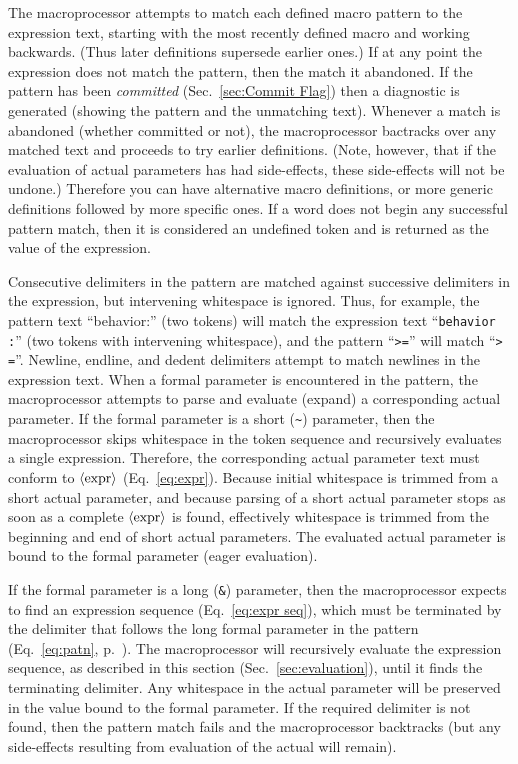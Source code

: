 \documentclass[12pt]{article}
\begin{document}
The macroprocessor attempts to match each defined macro pattern to the expression text, starting with the most recently defined macro and working backwards.
(Thus later definitions supersede earlier ones.)
If at any point the expression does not match the pattern, then the match it abandoned.
If the pattern has been \emph{committed} (Sec.\ \ref{sec:Commit Flag}) then a diagnostic is generated (showing the pattern and the unmatching text).
Whenever a match is abandoned (whether committed or not), the macroprocessor bactracks over any matched text and proceeds to try earlier definitions.
(Note, however, that if the evaluation of actual parameters has had side-effects, these side-effects will not be undone.)
Therefore you can have alternative macro definitions, or more generic definitions followed by more specific ones.
If a word does not begin any successful pattern match, then it is considered an undefined token and is returned as the value of the expression.

Consecutive delimiters in the pattern are matched against successive delimiters in the expression, but intervening whitespace is ignored.
Thus, for example, the pattern text ``\lstinline""behavior:'' (two tokens) will match the expression text ``\lstinline[showspaces=true]"behavior :"'' (two tokens with intervening whitespace),
and the pattern ``\lstinline">="'' will match ``\lstinline[showspaces=true]"> ="''.
Newline, endline, and dedent delimiters attempt to match newlines in the expression text.
When a formal parameter is encountered in the pattern, the macroprocessor attempts to parse and evaluate (expand) a corresponding actual parameter.
If the formal parameter is a short (\verb+~+) parameter, then the macroprocessor skips whitespace in the token sequence and recursively evaluates a single expression.
Therefore, the corresponding actual parameter text must conform to $\langle\mbox{expr}\rangle$ (Eq.\ \ref{eq:expr}).
Because initial whitespace is trimmed from a short actual parameter, and because parsing of a short actual parameter stops as soon as a complete $\langle\mbox{expr}\rangle$ is found, effectively whitespace is trimmed from the beginning and end of short actual parameters.
The evaluated actual parameter is bound to the formal parameter (eager evaluation).

If the formal parameter is a long (\verb+&+) parameter, then the macroprocessor expects to find an expression sequence (Eq.\ \ref{eq:expr seq}), which must be terminated by the delimiter that follows the long formal parameter in the pattern (Eq.\ \ref{eq:patn}, p.\ \pageref{eq:patn}).
The macroprocessor will recursively evaluate the expression sequence, as described in this section (Sec.\ \ref{sec:evaluation}), until it finds the terminating delimiter.
Any whitespace in the actual parameter will be preserved in the value bound to the formal parameter.
If the required delimiter is not found, then the pattern match fails and the macroprocessor backtracks
(but any side-effects resulting from evaluation of the actual will remain).
\end{document}

